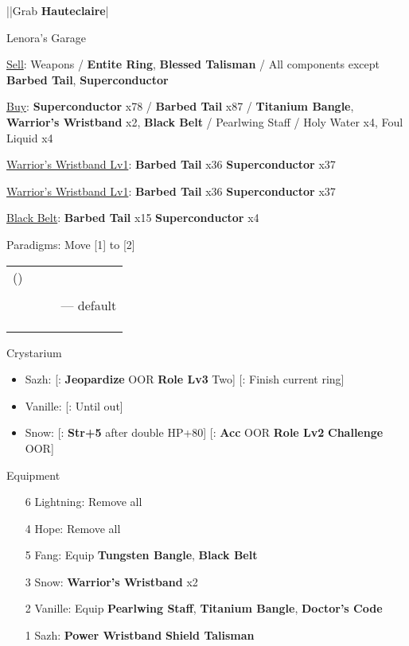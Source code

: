 \begin{mainlist}
	\item \skip|\skip|Grab \textbf{Hauteclaire}|\skip
\end{mainlist}
\begin{shop}{Lenora's Garage}
	\item \underline{Sell}: Weapons / \textbf{Entite Ring}, \textbf{Blessed Talisman} / All components except \textbf{Barbed Tail}, \textbf{Superconductor}
	\item \underline{Buy}: \textbf{Superconductor} x78 / \textbf{Barbed Tail} x87 / \textbf{Titanium Bangle}, \textbf{Warrior's Wristband} x2, \textbf{Black Belt} / Pearlwing Staff / Holy Water x4, Foul Liquid x4
\end{shop}
\begin{upgrade}
	\item \underline{Warrior's Wristband Lv1}: \textbf{Barbed Tail} x36 \to \textbf{Superconductor} x37
	\item \underline{Warrior's Wristband Lv1}: \textbf{Barbed Tail} x36 \to \textbf{Superconductor} x37
	\item \underline{Black Belt}: \textbf{Barbed Tail} x15 \to \textbf{Superconductor} x4
\end{upgrade}
\begin{menu}
	\item Paradigms: Move [1] to [2]
	\begin{tabular}{cccl}
		(\syn) & \sab & \rav &             \\
		\com   & \med & \com &             \\
		\syn   & \med & \com & --- default \\
		\com   & \sab & \com &             \\
		\syn   & \sab & \com &             \\
		\com   & \rav & \com &
	\end{tabular}
	\item Crystarium
	\begin{itemize}
		\item Sazh: [\com: \textbf{Jeopardize} OOR \to \textbf{Role Lv3} \to Two] [\rav: Finish current ring]
		\item Vanille: [\med: Until out]
		\item Snow: [\rav: \textbf{Str+5} after double HP+80] [\sen: \textbf{Acc} OOR \to \textbf{Role Lv2} \to \textbf{Challenge} OOR]
	\end{itemize}
	\item Equipment
	\begin{itemize}
		\item [6] Lightning: Remove all
		\item [4] Hope: Remove all
		\item [5] Fang: Equip \textbf{Tungsten Bangle}, \textbf{Black Belt}
		\item [3] Snow: \textbf{Warrior's Wristband\star} x2
		\item [2] Vanille: Equip \textbf{Pearlwing Staff}, \textbf{Titanium Bangle}, \textbf{Doctor's Code}
		\item [1] Sazh: \textbf{Power Wristband} \to \textbf{Shield Talisman}
	\end{itemize}
\end{menu}

